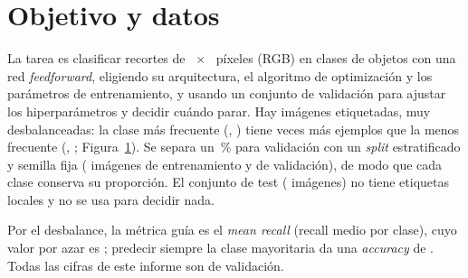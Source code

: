 \section{Objetivo y datos}
La tarea es clasificar recortes de ~$\times$~ píxeles (RGB) en 
clases de objetos con una red \emph{feedforward}, eligiendo su arquitectura, el algoritmo de optimización y los
parámetros de entrenamiento, y usando un conjunto de validación para ajustar los hiperparámetros y decidir cuándo
parar. Hay  imágenes etiquetadas, muy desbalanceadas: la clase más frecuente (,
) tiene  veces más ejemplos que la menos frecuente (,
; Figura~\ref{fig:classes}). Se separa un \,\% para validación con un
\emph{split} estratificado y semilla fija ( imágenes de entrenamiento y  de validación), de
modo que cada clase conserva su proporción. El conjunto de test ( imágenes) no tiene etiquetas locales y no
se usa para decidir nada.

Por el desbalance, la métrica guía es el \emph{mean recall} (recall medio por clase), cuyo valor por azar es
; predecir siempre la clase mayoritaria da una \emph{accuracy} de . Todas
las cifras de este informe son de validación.

\begin{figure}[!htbp]
  \centering
  \caption{}
  \label{fig:classes}
\end{figure}